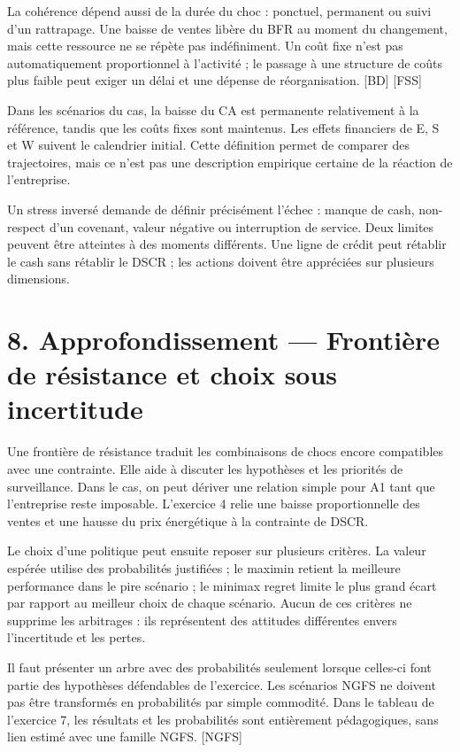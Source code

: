 \documentclass[12pt,a4paper]{article}
\begin{document}
La cohérence dépend aussi de la durée du choc : ponctuel, permanent ou suivi d’un rattrapage. Une baisse de ventes libère du BFR au moment du changement, mais cette ressource ne se répète pas indéfiniment. Un coût fixe n’est pas automatiquement proportionnel à l’activité ; le passage à une structure de coûts plus faible peut exiger un délai et une dépense de réorganisation. [BD] [FSS]


Dans les scénarios du cas, la baisse du CA est permanente relativement à la référence, tandis que les coûts fixes sont maintenus. Les effets financiers de E, S et W suivent le calendrier initial. Cette définition permet de comparer des trajectoires, mais ce n’est pas une description empirique certaine de la réaction de l’entreprise.


Un stress inversé demande de définir précisément l’échec : manque de cash, non-respect d’un covenant, valeur négative ou interruption de service. Deux limites peuvent être atteintes à des moments différents. Une ligne de crédit peut rétablir le cash sans rétablir le DSCR ; les actions doivent être appréciées sur plusieurs dimensions.

\section*{8. Approfondissement --- Frontière de résistance et choix sous incertitude}
Une frontière de résistance traduit les combinaisons de chocs encore compatibles avec une contrainte. Elle aide à discuter les hypothèses et les priorités de surveillance. Dans le cas, on peut dériver une relation simple pour A1 tant que l’entreprise reste imposable. L’exercice 4 relie une baisse proportionnelle des ventes et une hausse du prix énergétique à la contrainte de DSCR.


Le choix d’une politique peut ensuite reposer sur plusieurs critères. La valeur espérée utilise des probabilités justifiées ; le maximin retient la meilleure performance dans le pire scénario ; le minimax regret limite le plus grand écart par rapport au meilleur choix de chaque scénario. Aucun de ces critères ne supprime les arbitrages : ils représentent des attitudes différentes envers l’incertitude et les pertes.


Il faut présenter un arbre avec des probabilités seulement lorsque celles-ci font partie des hypothèses défendables de l’exercice. Les scénarios NGFS ne doivent pas être transformés en probabilités par simple commodité. Dans le tableau de l’exercice 7, les résultats et les probabilités sont entièrement pédagogiques, sans lien estimé avec une famille NGFS. [NGFS]
\end{document}
